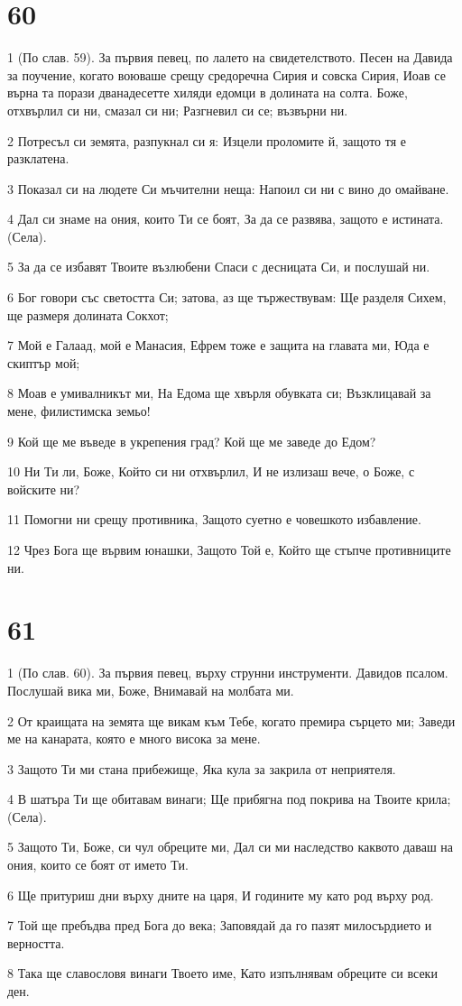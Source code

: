 \chapter{60}

\par 1 (По слав. 59). За първия певец, по лалето на свидетелството. Песен на Давида за поучение, когато воюваше срещу средоречна Сирия и совска Сирия, Иоав се върна та порази дванадесетте хиляди едомци в долината на солта. Боже, отхвърлил си ни, смазал си ни; Разгневил си се; възвърни ни.
\par 2 Потресъл си земята, разпукнал си я: Изцели проломите й, защото тя е разклатена.
\par 3 Показал си на людете Си мъчителни неща: Напоил си ни с вино до омайване.
\par 4 Дал си знаме на ония, които Ти се боят, За да се развява, защото е истината. (Села).
\par 5 За да се избавят Твоите възлюбени Спаси с десницата Си, и послушай ни.
\par 6 Бог говори със светостта Си; затова, аз ще тържествувам: Ще разделя Сихем, ще размеря долината Сокхот;
\par 7 Мой е Галаад, мой е Манасия, Ефрем тоже е защита на главата ми, Юда е скиптър мой;
\par 8 Моав е умивалникът ми, На Едома ще хвърля обувката си; Възклицавай за мене, филистимска земьо!
\par 9 Кой ще ме въведе в укрепения град? Кой ще ме заведе до Едом?
\par 10 Ни Ти ли, Боже, Който си ни отхвърлил, И не излизаш вече, о Боже, с войските ни?
\par 11 Помогни ни срещу противника, Защото суетно е човешкото избавление.
\par 12 Чрез Бога ще вървим юнашки, Защото Той е, Който ще стъпче противниците ни.

\chapter{61}

\par 1 (По слав. 60). За първия певец, върху струнни инструменти. Давидов псалом. Послушай вика ми, Боже, Внимавай на молбата ми.
\par 2 От краищата на земята ще викам към Тебе, когато премира сърцето ми; Заведи ме на канарата, която е много висока за мене.
\par 3 Защото Ти ми стана прибежище, Яка кула за закрила от неприятеля.
\par 4 В шатъра Ти ще обитавам винаги; Ще прибягна под покрива на Твоите крила; (Села).
\par 5 Защото Ти, Боже, си чул обреците ми, Дал си ми наследство каквото даваш на ония, които се боят от името Ти.
\par 6 Ще притуриш дни върху дните на царя, И годините му като род върху род.
\par 7 Той ще пребъдва пред Бога до века; Заповядай да го пазят милосърдието и верността.
\par 8 Така ще славословя винаги Твоето име, Като изпълнявам обреците си всеки ден.

